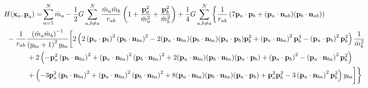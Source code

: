\documentclass[aps,onecolumn,notitlepage,eqsecnum,nofootinbib,floatfix,superscriptaddress]{revtex4-1}
\begin{document}
\begin{widetext}
\begin{equation} \label{SC2-LSBHamiltonian}
\begin{aligned} 
  H (\textbf{x}_a,\textbf{p}_a)= &\sum_{a= 1}^{N}\bar{m}_{a}- \frac{1}{2}G\sum_{a,b\neq a}^{N}\frac{\bar{m}_{a}\bar{m}_{b}}{r_{ab}}\left(1+ \frac{\textbf{p}^{2}_{a}}{\bar{m}^{2}_{a}}+ \frac{\textbf{p}^{2}_{b}}{\bar{m}^{2}_{b}}\right)+ \frac{1}{4}G\sum_{a,b\neq a}^{N} \biggl\{\frac{1}{r_{ab}}\left(7\mathbf{p}_{a}\cdot\mathbf{p}_{b}+ (\mathbf{p}_{a}\cdot\mathbf{n}_{ab})(\mathbf{p}_{b}\cdot\mathbf{n}_{ab})\right) \\
                     &\hspace{-1.75cm}-\frac{1}{r_{ab}}\frac{\left(\bar{m}_a\bar{m}_b\right)^{-1}}{\left(y_{ba}+1\right)^{2}y_{ba}}\biggl[ 2\left(2\left(\mathbf{p}_{a}\cdot\mathbf{p}_{b}\right)^{2}\left(\mathbf{p}_{b}\cdot\mathbf{n}_{ba}\right)^{2}- 2(\mathbf{p}_{a}\cdot\mathbf{n}_{ba})(\mathbf{p}_{b}\cdot\mathbf{n}_{ba})(\mathbf{p}_{a}\cdot\mathbf{p}_{b})\mathbf{p}^{2}_{b}+ \left(\mathbf{p}_{a}\cdot\mathbf{n}_{ba}\right)^{2}\mathbf{p}^{4}_{b} - \left(\mathbf{p}_{a}\cdot\mathbf{p}_{b}\right)^{2}\mathbf{p}^{2}_{b}\right)\frac{1}{\bar{m}^{2}_{b}}  \\
                     &\hspace{-.75cm} + 2\left(-\mathbf{p}^{2}_{a}\left(\mathbf{p}_{b}\cdot\mathbf{n}_{ba}\right)^{2}+ \left(\mathbf{p}_{a}\cdot\mathbf{n}_{ba}\right)^{2}\left(\mathbf{p}_{b}\cdot\mathbf{n}_{ba}\right)^{2}+ 2(\mathbf{p}_{a}\cdot\mathbf{n}_{ba})(\mathbf{p}_{b}\cdot\mathbf{n}_{ba})(\mathbf{p}_{a}\cdot\mathbf{p}_{b})+ \left(\mathbf{p}_{a}\cdot\mathbf{p}_{b}\right)^{2}- \left(\mathbf{p}_{a}\cdot\mathbf{n}_{ba}\right)^{2}\mathbf{p}^{2}_{b}\right)  \\
                    & \hspace{-.75cm} + \left(-3\mathbf{p}^{2}_a\left(\mathbf{p}_{b}\cdot\mathbf{n}_{ba}\right)^{2}+ \left(\mathbf{p}_{a}\cdot\mathbf{n}_{ba}\right)^{2}\left(\mathbf{p}_{b}\cdot\mathbf{n}_{ba}\right)^{2}+ 8(\mathbf{p}_{a}\cdot\mathbf{n}_{ba})(\mathbf{p}_{b}\cdot\mathbf{n}_{ba})(\mathbf{p}_{a}\cdot\mathbf{p}_{b})+ \mathbf{p}^{2}_{a}\mathbf{p}^{2}_{b}-3\left(\mathbf{p}_{a}\cdot\mathbf{n}_{ba}\right)^{2}\mathbf{p}^{2}_{b}\right)y_{ba}\biggr]\biggr\}
\end{aligned}
\end{equation}
\end{widetext}
\end{document}
